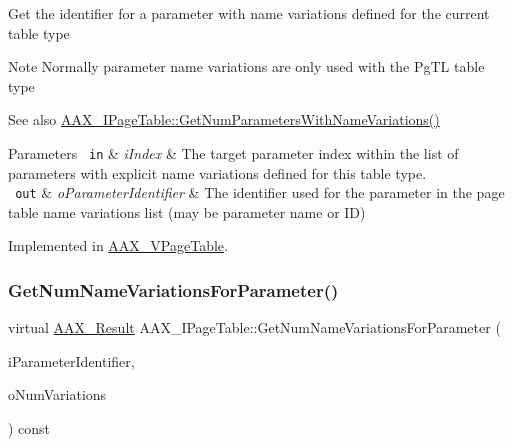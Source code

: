 Get the identifier for a parameter with name variations defined for the current table type

\begin{DoxyNote}{Note}
Normally parameter name variations are only used with the {\ttfamily \textquotesingle{}Pg\+TL\textquotesingle{}} table type
\end{DoxyNote}

\begin{DoxyItemize}
\item \begin{DoxySeeAlso}{See also}
\mbox{\hyperlink{a01849_ad186d2870ad5c188a7375080e8a7907b}{A\+A\+X\+\_\+\+I\+Page\+Table\+::\+Get\+Num\+Parameters\+With\+Name\+Variations()}}
\end{DoxySeeAlso}

\begin{DoxyParams}[1]{Parameters}
\mbox{\texttt{ in}}  & {\em i\+Index} & The target parameter index within the list of parameters with explicit name variations defined for this table type. \\
\hline
\mbox{\texttt{ out}}  & {\em o\+Parameter\+Identifier} & The identifier used for the parameter in the page table name variations list (may be parameter name or ID) \\
\hline
\end{DoxyParams}

\end{DoxyItemize}

Implemented in \mbox{\hyperlink{a01929_a3066b8c3ab0868c23831778b939fadd7}{A\+A\+X\+\_\+\+V\+Page\+Table}}.

\mbox{\label{a01849_af8be797a3ec7ed3117e720dd29ea7cc7}} 
\subsubsection{\texorpdfstring{GetNumNameVariationsForParameter()}{GetNumNameVariationsForParameter()}}
{\footnotesize\ttfamily virtual \mbox{\hyperlink{a00392_a4d8f69a697df7f70c3a8e9b8ee130d2f}{A\+A\+X\+\_\+\+Result}} A\+A\+X\+\_\+\+I\+Page\+Table\+::\+Get\+Num\+Name\+Variations\+For\+Parameter (\begin{DoxyParamCaption}\item[{\mbox{\hyperlink{a00392_ab4e01b971dac1b25632fd9f710dd8f77}{A\+A\+X\+\_\+\+C\+Page\+Table\+Param\+ID}}}]{i\+Parameter\+Identifier,  }\item[{int32\+\_\+t \&}]{o\+Num\+Variations }\end{DoxyParamCaption}) const\hspace{0.3cm}{\ttfamily [pure virtual]}}

